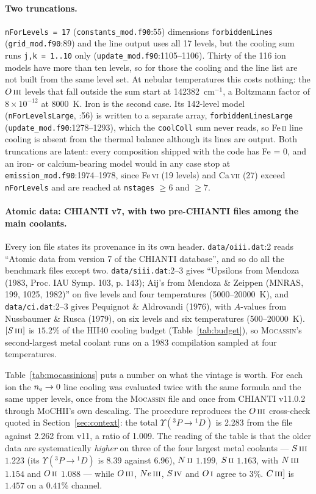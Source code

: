 \documentclass[english,a4paper]{my_memo}
\newcommand{\code}[1]{\texttt{#1}}
\newcommand{\MoCHII}{\textsc{MoCHII}}
\newcommand{\Mocassin}{\textsc{Mocassin}}
\newcommand{\OI}{O\,\textsc{i}}
\newcommand{\OII}{O\,\textsc{ii}}
\newcommand{\OIII}{O\,\textsc{iii}}
\newcommand{\NII}{N\,\textsc{ii}}
\newcommand{\NIII}{N\,\textsc{iii}}
\newcommand{\CIII}{C\,\textsc{iii}}
\newcommand{\SII}{S\,\textsc{ii}}
\newcommand{\SIII}{S\,\textsc{iii}}
\newcommand{\SIV}{S\,\textsc{iv}}
\newcommand{\NeIII}{Ne\,\textsc{iii}}
\newcommand{\nel}{n_{\rm e}}
\begin{document}
\paragraph{Two truncations.}  \code{nForLevels = 17}
(\code{constants\_mod.f90}:55) dimensions \code{forbiddenLines}
(\code{grid\_mod.f90}:89) and the line output uses all 17 levels, but the
cooling sum runs \code{j,k = 1..10} only (\code{update\_mod.f90}:1105--1106).
Thirty of the 116 ion models have more than ten levels, so for those the
cooling and the line list are not built from the same level set.  At nebular
temperatures this costs nothing: the $\OIII{}$ levels that fall outside the sum
start at 142382~cm$^{-1}$, a Boltzmann factor of $8\times10^{-12}$ at 8000~K.
Iron is the second case.  Its 142-level model (\code{nForLevelsLarge}, :56) is
written to a separate array, \code{forbiddenLinesLarge}
(\code{update\_mod.f90}:1278--1293), which the \code{coolColl} sum never reads,
so Fe\,\textsc{ii} line cooling is absent from the thermal balance although its
lines are output.  Both truncations are latent: every composition shipped with
the code has Fe = 0, and an iron- or calcium-bearing model would in any case
stop at \code{emission\_mod.f90}:1974--1978, since Fe\,\textsc{vi} (19 levels)
and Ca\,\textsc{vii} (27) exceed \code{nForLevels} and are reached at
\code{nstages} $\geq 6$ and $\geq 7$.

\paragraph{Atomic data: CHIANTI v7, with two pre-CHIANTI files among the main
coolants.}  Every ion file states its provenance in its own header.
\code{data/oiii.dat}:2 reads ``Atomic data from version 7 of the CHIANTI
database'', and so do all the benchmark files except two.
\code{data/siii.dat}:2--3 gives ``Upsilons from Mendoza (1983, Proc. IAU Symp.
103, p. 143); Aij's from Mendoza \& Zeippen (MNRAS, 199, 1025, 1982)'' on five
levels and four temperatures (5000--20000~K), and \code{data/ci.dat}:2--3 gives
Pequignot \& Aldrovandi (1976), with $A$-values from Nussbaumer \& Rusca
(1979), on six levels and six temperatures (500--20000~K).  $[\SIII{}]$ is
$15.2\%$ of the HII40 cooling budget (Table~\ref{tab:budget}), so \Mocassin{}'s
second-largest metal coolant runs on a 1983 compilation sampled at four
temperatures.

Table~\ref{tab:mocassinions} puts a number on what the vintage is worth.  For
each ion the $\nel \to 0$ line cooling was evaluated twice with the same
formula and the same upper levels, once from the \Mocassin{} file and once from
CHIANTI v11.0.2 through \MoCHII{}'s own descaling.  The procedure reproduces
the $\OIII{}$ cross-check quoted in Section~\ref{sec:context}: the total
$\Upsilon(^3P \to {}^1D)$ is 2.283 from the file against 2.262 from v11, a
ratio of 1.009.  The reading of the table is that the older data are
systematically \emph{higher} on three of the four largest metal coolants ---
$\SIII{}$ $1.223$ (its $\Upsilon(^3P \to {}^1D)$ is 8.39 against 6.96),
$\NII{}$ $1.199$, $\SII{}$ $1.163$, with $\NIII{}$ $1.154$ and $\OII{}$
$1.088$ --- while $\OIII{}$, $\NeIII{}$, $\SIV{}$ and $\OI{}$ agree to $3\%$.
$\CIII{}]$ is $1.457$ on a $0.41\%$ channel.
\end{document}
